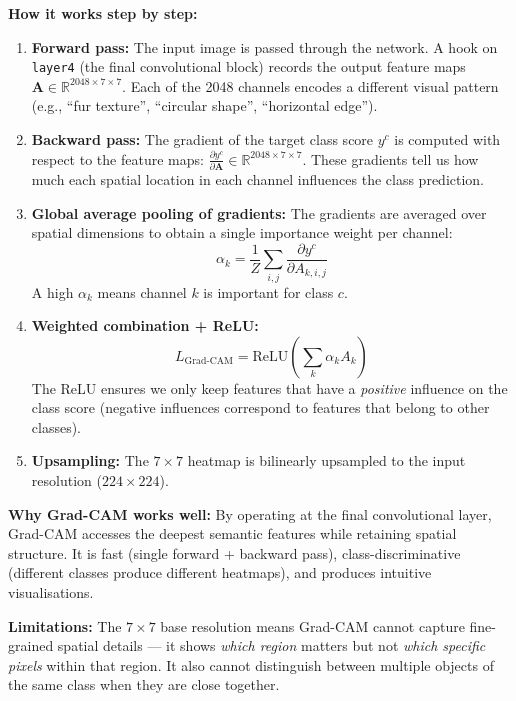 \documentclass[12pt, a4paper]{article}
\begin{document}
\textbf{How it works step by step:}
\begin{enumerate}[leftmargin=*]
    \item \textbf{Forward pass:} The input image is passed through the network.
          A hook on \texttt{layer4} (the final convolutional block) records the
          output feature maps $\mathbf{A} \in \mathbb{R}^{2048 \times 7 \times 7}$.
          Each of the 2048 channels encodes a different visual pattern (e.g.,
          ``fur texture'', ``circular shape'', ``horizontal edge'').
    \item \textbf{Backward pass:} The gradient of the target class score $y^c$
          is computed with respect to the feature maps:
          $\frac{\partial y^c}{\partial \mathbf{A}} \in \mathbb{R}^{2048 \times 7 \times 7}$.
          These gradients tell us how much each spatial location in each channel
          influences the class prediction.
    \item \textbf{Global average pooling of gradients:} The gradients are
          averaged over spatial dimensions to obtain a single importance weight
          per channel:
          \begin{equation}
          \alpha_k = \frac{1}{Z} \sum_{i,j} \frac{\partial y^c}{\partial A_{k,i,j}}
          \end{equation}
          A high $\alpha_k$ means channel $k$ is important for class $c$.
    \item \textbf{Weighted combination + ReLU:}
          \begin{equation}
          L_{\text{Grad-CAM}} = \text{ReLU}\left(\sum_k \alpha_k A_k\right)
          \end{equation}
          The ReLU ensures we only keep features that have a \emph{positive}
          influence on the class score (negative influences correspond to
          features that belong to other classes).
    \item \textbf{Upsampling:} The $7 \times 7$ heatmap is bilinearly
          upsampled to the input resolution ($224 \times 224$).
\end{enumerate}

\textbf{Why Grad-CAM works well:} By operating at the final convolutional
layer, Grad-CAM accesses the deepest semantic features while retaining spatial
structure.  It is fast (single forward + backward pass), class-discriminative
(different classes produce different heatmaps), and produces intuitive
visualisations.

\textbf{Limitations:} The $7 \times 7$ base resolution means Grad-CAM cannot
capture fine-grained spatial details --- it shows \emph{which region} matters
but not \emph{which specific pixels} within that region.  It also cannot
distinguish between multiple objects of the same class when they are close
together.
\end{document}
